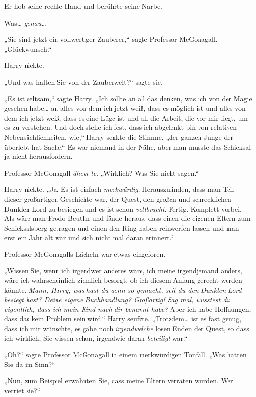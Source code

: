 {Er hob seine rechte Hand und berührte seine Narbe.

Was… \emph{genau…}

„Sie sind jetzt ein vollwertiger Zauberer,“ sagte Professor McGonagall. „Glückwunsch.“

Harry nickte.

„Und was halten Sie von der Zauberwelt?“ sagte sie.

„Es ist seltsam,“ sagte Harry. „Ich sollte an all das denken, was ich von der Magie gesehen habe… an alles von dem ich jetzt weiß, dass es möglich ist und alles von dem ich jetzt weiß, dass es eine Lüge ist und all die Arbeit, die vor mir liegt, um es zu verstehen. Und doch stelle ich fest, dass ich abgelenkt bin von relativen Nebensächlichkeiten, wie,“ Harry senkte die Stimme, „der ganzen Junge-der-überlebt-hat-Sache.“ Es war niemand in der Nähe, aber man musste das Schicksal ja nicht herausfordern.

Professor McGonagall \emph{ähem-te}. „Wirklich? Was Sie nicht sagen.“

Harry nickte. „Ja. Es ist einfach \emph{merkwürdig}. Herauszufinden, dass man Teil dieser großartigen Geschichte war, der Quest, den großen und schrecklichen Dunklen Lord zu besiegen und es ist schon \emph{vollbracht}. Fertig. Komplett vorbei. Als wäre man Frodo Beutlin und fände heraus, dass einen die eigenen Eltern zum Schicksalsberg getragen und einen den Ring haben reinwerfen lassen und man erst ein Jahr alt war und sich nicht mal daran erinnert.“

Professor McGonagalls Lächeln war etwas eingeforen.

„Wissen Sie, wenn ich irgendwer anderes wäre, ich meine irgendjemand anders, wäre ich wahrscheinlich ziemlich besorgt, ob ich diesem Anfang gerecht werden könnte. \emph{Mann, Harry, was hast du denn so gemacht, seit du den Dunklen Lord besiegt hast? Deine eigene Buchhandlung? Großartig! Sag mal, wusstest du eigentlich, dass ich mein Kind nach dir benannt habe?} Aber ich habe Hoffnungen, dass das kein Problem sein wird.“ Harry seufzte. „Trotzdem… ist es fast genug, dass ich mir wünschte, es gäbe noch \emph{irgendwelche} losen Enden der Quest, so dass ich wirklich, Sie wissen schon, irgendwie daran \emph{beteiligt} war.“

„Oh?“ sagte Professor McGonagall in einem merkwürdigen Tonfall. „Was hatten Sie da im Sinn?“

„Nun, zum Beispiel erwähnten Sie, dass meine Eltern verraten wurden. Wer verriet sie?“

}
